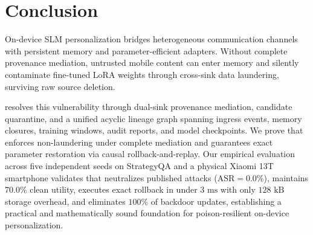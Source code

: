 \section{Conclusion}
\label{sec:conclusion}

On-device SLM personalization bridges heterogeneous communication channels with persistent memory and parameter-efficient adapters. Without complete provenance mediation, untrusted mobile content can enter memory and silently contaminate fine-tuned LoRA weights through cross-sink data laundering, surviving raw source deletion. 

\PG{} resolves this vulnerability through dual-sink provenance mediation, candidate quarantine, and a unified acyclic lineage graph spanning ingress events, memory closures, training windows, audit reports, and model checkpoints. We prove that \PG{} enforces non-laundering under complete mediation and guarantees exact parameter restoration via causal rollback-and-replay. Our empirical evaluation across five independent seeds on StrategyQA and a physical Xiaomi 13T smartphone validates that \PG{} neutralizes published attacks ($\mathrm{ASR}=0.0\%$), maintains $70.0\%$ clean utility, executes exact rollback in under $3\text{ ms}$ with only $128\text{ kB}$ storage overhead, and eliminates $100\%$ of backdoor updates, establishing a practical and mathematically sound foundation for poison-resilient on-device personalization.
